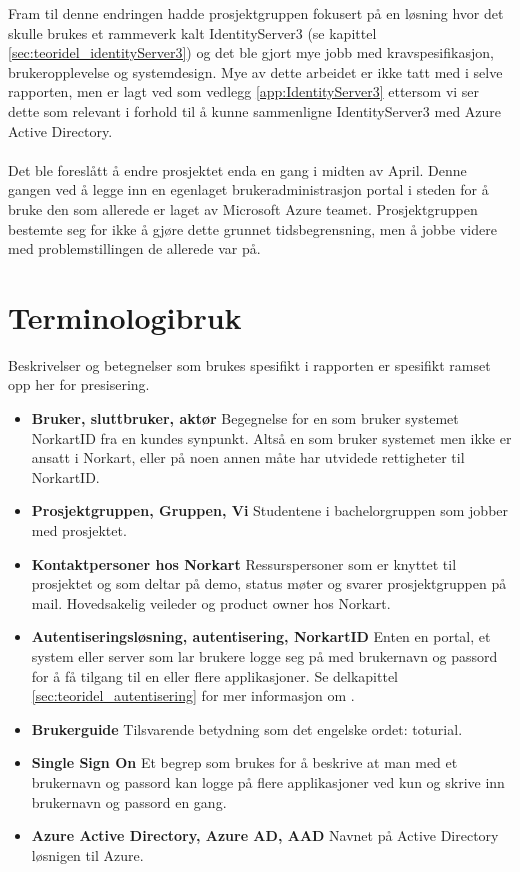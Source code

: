 Fram til denne endringen hadde prosjektgruppen fokusert på en løsning hvor det skulle brukes et rammeverk kalt IdentityServer3 (se kapittel \ref{sec:teoridel_identityServer3}) og det ble gjort mye jobb med kravspesifikasjon, brukeropplevelse og systemdesign. Mye av dette arbeidet er ikke tatt med i selve rapporten, men er lagt ved som vedlegg \ref{app:IdentityServer3} ettersom vi ser dette som relevant i forhold til å kunne sammenligne IdentityServer3 med Azure Active Directory. 
\\
\\
Det ble foreslått å endre prosjektet enda en gang i midten av April. Denne gangen ved å legge inn en egenlaget brukeradministrasjon portal i steden for å bruke den som allerede er laget av Microsoft Azure teamet. Prosjektgruppen bestemte seg for ikke å gjøre dette grunnet tidsbegrensning, men å jobbe videre med problemstillingen de allerede var på.

\section{Terminologibruk}
\label{sec:innledning_terminologi}
Beskrivelser og betegnelser som brukes spesifikt i rapporten er spesifikt ramset opp her for presisering.
\\
\begin{itemize}
\item \textbf{Bruker, sluttbruker, aktør} Begegnelse for en som bruker systemet NorkartID fra en kundes synpunkt. Altså en som bruker systemet men ikke er ansatt i Norkart, eller på noen annen måte har utvidede rettigheter til NorkartID.


\item \textbf{Prosjektgruppen, Gruppen, Vi} Studentene i bachelorgruppen som jobber med prosjektet.

\item \textbf{Kontaktpersoner hos Norkart} Ressurspersoner som er knyttet til prosjektet og som deltar på demo, status møter og svarer prosjektgruppen på mail. Hovedsakelig veileder og product owner hos Norkart. 

\item \textbf{Autentiseringsløsning, autentisering, NorkartID} Enten en portal, et system eller server som lar brukere logge seg på med brukernavn og passord for å få tilgang til en eller flere applikasjoner. Se delkapittel \ref{sec:teoridel_autentisering} for mer informasjon om .

\item \textbf{Brukerguide} Tilsvarende betydning som det engelske ordet: toturial. 

\item \textbf{Single Sign On} Et begrep som brukes for å beskrive at man med et brukernavn og passord kan logge på flere applikasjoner ved kun og skrive inn brukernavn og passord en gang.  

\item \textbf{Azure Active Directory, Azure AD, AAD} Navnet på Active Directory løsnigen til Azure. 
\end{itemize}